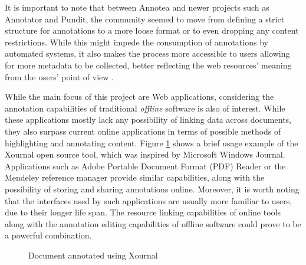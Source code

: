 It is important to note that between Annotea and newer projects such as
Annotator and Pundit, the community seemed to move from defining a strict
structure for annotations to a more loose format or to even dropping any
content restrictions. While this might impede the consumption of annotations by
automated systems, it also makes the process more accessible to users allowing
for more metadata to be collected, better reflecting the web resources' meaning
from the users' point of view \cite{ref:wu}.

While the main focus of this project are Web applications, considering the
annotation capabilities of traditional \textit{offline} software is also of
interest. While these applications mostly lack any possibility of linking data
across documents, they also surpass current online applications in terms of
possible methods of highlighting and annotating content. Figure
\ref{fig:xournal} shows a brief usage example of the Xournal open source tool,
which was inspired by Microsoft Windows Journal. Applications such as Adobe
Portable Document Format (PDF) Reader or the Mendeley reference manager provide
similar capabilities, along with the possibility of storing and sharing
annotations online. Moreover, it is worth noting that the interfaces used by
such applications are usually more familiar to users, due to their longer life
span. The resource linking capabilities of online tools along with the
annotation editing capabilities of offline software could prove to be a
powerful combination.

\begin{figure}[!ht]
  \centering
  \caption{Document annotated using Xournal}
  \label{fig:xournal}
\end{figure}
